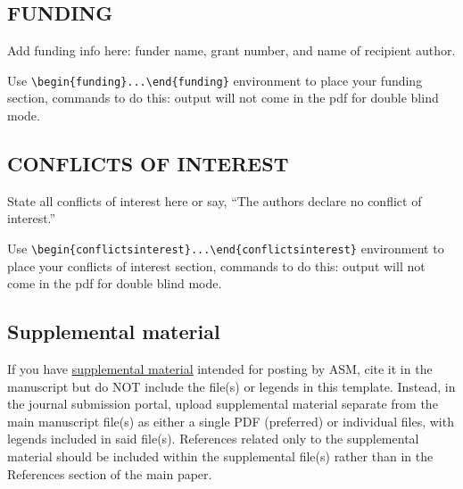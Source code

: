 \documentclass{asmarticle}
\begin{document}
\begin{funding}
\section{FUNDING}
	Add funding info here: funder name, grant number, and name of recipient author. 

Use \verb|\begin{funding}...\end{funding}| environment to place your funding section, commands to do this: output will not come in the pdf for double blind mode.
\end{funding}

\begin{conflictsinterest}
\section{CONFLICTS OF INTEREST}
	State all conflicts of interest here or say, ``The authors declare no conflict of interest.''

Use \verb|\begin{conflictsinterest}...\end{conflictsinterest}| environment to place your conflicts of interest section, commands to do this: output will not come in the pdf for double blind mode.
\end{conflictsinterest}


\subsection{Supplemental material}
	If you have \href{https://journals.asm.org/supplemental-material}{\underline{supplemental material}} intended for posting by ASM, cite it in the manuscript but do NOT include the file(s) or legends in this template. Instead, in the journal submission portal, upload supplemental material separate from the main manuscript file(s) as either a single PDF (preferred) or individual files, with legends included in said file(s). References related only to the supplemental material should be included within the supplemental file(s) rather than in the References section of the main paper.
\end{document}
